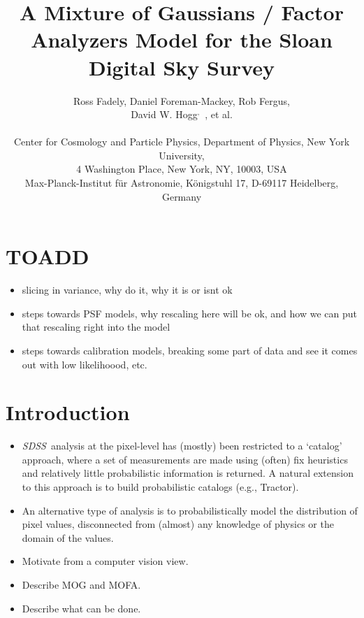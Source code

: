 \documentclass[letterpaper,12pt]{article}
\title{A Mixture of Gaussians / Factor Analyzers Model for the Sloan Digital Sky Survey}
\author{Ross Fadely\nyu, Daniel Foreman-Mackey\nyu, Rob Fergus\nyu, \\ 
David W. Hogg\nyu$^,$\mpia~,  et al. \\
\\
\small
\nyu Center for Cosmology and Particle Physics,
                        Department of Physics, New York University,\\ \small
                        4 Washington Place, New York, NY, 10003, USA \\
\small\mpia Max-Planck-Institut f\"ur Astronomie,
                        K\"onigstuhl 17, D-69117 Heidelberg, Germany \\
}
\newcommand{\sdss}{{\it SDSS}}
\begin{document}
\maketitle

\begin{abstract}
\end{abstract}


\section{TOADD}

\begin{itemize}

\item slicing in variance, why do it, why it is or isnt ok

\item steps towards PSF models, why rescaling here will be ok, and how we
can put that rescaling right into the model

\item steps towards calibration models, breaking some part of data and see 
it comes out with low likelihoood, etc.

\end{itemize}


\section{Introduction}

\begin{itemize}


\item \sdss\, analysis at the pixel-level has (mostly) been restricted to 
a `catalog' approach, where a set of measurements are made using 
(often) fix heuristics and relatively little probabilistic information is returned.  
A natural extension to this approach is to build probabilistic catalogs (e.g., 
Tractor).

\item An alternative type of analysis is to probabilistically model the distribution 
of pixel values, disconnected from (almost) any knowledge of physics or the 
domain of the values.  

\item Motivate from a computer vision view.

\item Describe MOG and MOFA.

\item Describe what can be done.


\end{itemize}
\end{document}
